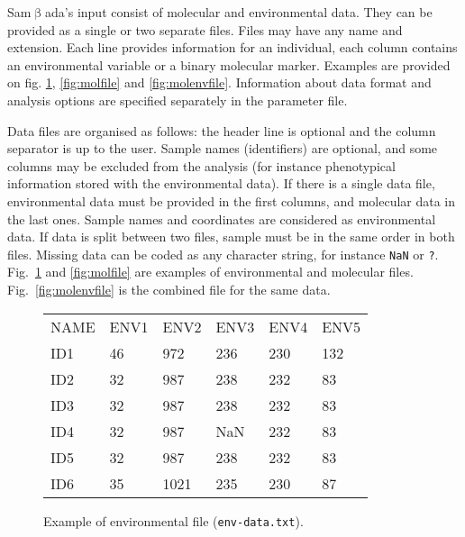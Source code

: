 \documentclass[a4paper,11pt]{article}
\newcommand{\smb}{\textsf{Sam$\upbeta$ada}}
\newcommand{\prog}[1]{\texttt{#1}}
\begin{document}
\smb's input consist of molecular and environmental data.
They can be provided as a single or two separate files.
Files may have any name and extension. 
Each line provides information for an individual, each column contains an environmental variable or a binary molecular marker.
Examples are provided on fig. \ref{fig:envfile}, \ref{fig:molfile} and \ref{fig:molenvfile}.
Information about data format and analysis options are specified separately in the parameter file.

Data files are organised as follows: the header line is optional and the column separator is up to the user.
Sample names (identifiers) are optional, and some columns may be excluded from the analysis (for instance phenotypical information stored with the environmental data).
If there is a single data file, environmental data must be provided in the first columns, and molecular data in the last ones.
Sample names and coordinates are considered as environmental data.
If data is split between two files, sample must be in the same order in both files.
Missing data can be coded as any character string, for instance \prog{NaN} or \prog{?}.
Fig.~\ref{fig:envfile} and \ref{fig:molfile} are examples of environmental and molecular files.
Fig.~\ref{fig:molenvfile} is the combined file for the same data.


\begin{figure}[htbp]

\begin{center}
		\begin{mdframed}[backgroundcolor=white,userdefinedwidth=9.5cm,align=center]
		\begin{tabular}{llllll}
NAME&	ENV1	&ENV2	&ENV3	&ENV4	&ENV5	\\
ID1	&	46	&	972	&	236	&	230	&	132		\\
ID2	&	32	&	987	&	238	&	232	&	83		\\
ID3	&	32	&	987	&	238	&	232	&	83		\\
ID4	&	32	&	987	&	NaN	&	232	&	83		\\
ID5	&	32	&	987	&	238	&	232	&	83		\\
ID6	&	35	&	1021	&	235	&	230	&	87		\\		
\end{tabular}
	\end{mdframed}
	\end{center}
	\caption{Example of environmental file (\texttt{env-data.txt}).}
	\label{fig:envfile}
\end{figure}
\end{document}
